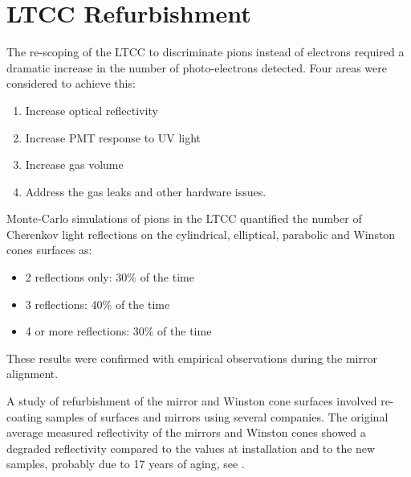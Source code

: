 \section{LTCC Refurbishment}


The re-scoping of the LTCC to discriminate pions instead of electrons required a dramatic increase in the
number of photo-electrons detected. Four areas were considered to achieve this:

\begin{enumerate}
	\item Increase optical reflectivity
	\item Increase PMT response to UV light
	\item Increase gas volume
	\item Address the gas leaks and other hardware issues.
\end{enumerate}


Monte-Carlo simulations of pions in the LTCC quantified the number of Cherenkov light  reflections on the cylindrical, elliptical,
parabolic and Winston cones surfaces as:

\begin{itemize}
	\item 2 reflections only: 30$\%$ of the time
	\item 3 reflections: 40$\%$ of the time
	\item 4 or more reflections: 30$\%$ of the time
\end{itemize}

These results were confirmed with empirical observations during the mirror alignment.

A study of refurbishment of the mirror and Winston cone surfaces
involved re-coating samples of surfaces and mirrors using several companies.
The original average measured reflectivity of the mirrors and Winston cones
showed a degraded reflectivity compared to the values at installation and to
the new samples, probably due to  17 years of aging, see .


